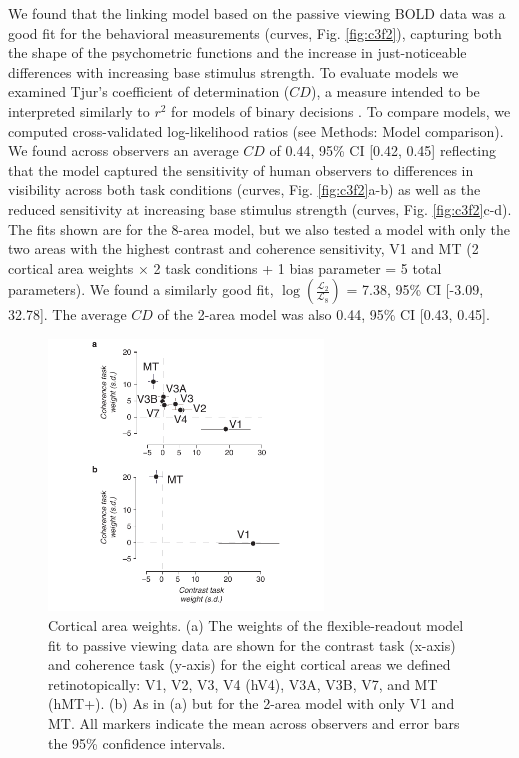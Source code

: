 We found that the linking model based on the passive viewing BOLD data was a good fit for the behavioral measurements (curves, Fig. \ref{fig:c3f2}), capturing both the shape of the psychometric functions and the increase in just-noticeable differences with increasing base stimulus strength. To evaluate models we examined Tjur’s coefficient of determination ($CD$), a measure intended to be interpreted similarly to $r^2$ for models of binary decisions \citep{Tjur2009-az}. To compare models, we computed cross-validated log-likelihood ratios (see Methods: Model comparison). We found across observers an average $CD$ of 0.44, 95\% CI [0.42, 0.45] reflecting that the model captured the sensitivity of human observers to differences in visibility across both task conditions (curves, Fig. \ref{fig:c3f2}a-b) as well as the reduced sensitivity at increasing base stimulus strength (curves, Fig. \ref{fig:c3f2}c-d). The fits shown are for the 8-area model, but we also tested a model with only the two areas with the highest contrast and coherence sensitivity, V1 and MT (2 cortical area weights $\times$ 2 task conditions + 1 bias parameter = 5 total parameters). We found a similarly good fit, $\log(\frac{\mathcal{L}_{2}}{\mathcal{L}_{8}})$ = 7.38, 95\% CI [-3.09, 32.78]. The average $CD$ of the 2-area model was also 0.44, 95\% CI [0.43, 0.45].

\begin{figure}
\centering
\includegraphics[keepaspectratio,width=0.65\textwidth]{figs_c3/Fig5_weights.pdf}
\caption[Cortical area weights]{Cortical area weights. (a) The weights of the flexible-readout model fit to passive viewing data are shown for the contrast task (x-axis) and coherence task (y-axis) for the eight cortical areas we defined retinotopically: V1, V2, V3, V4 (hV4), V3A, V3B, V7, and MT (hMT+). (b) As in (a) but for the 2-area model with only V1 and MT. All markers indicate the mean across observers and error bars the 95\% confidence intervals.}
\label{fig:c3f5}
\end{figure}

